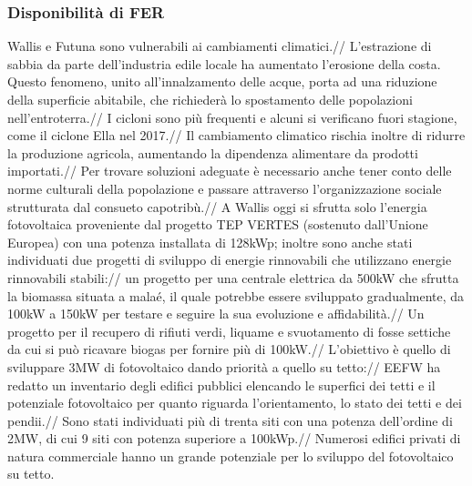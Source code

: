 \documentclass[fleqn,10pt]{SelfArx} %
\begin{document}
\subsubsection{Disponibilità di FER}
Wallis e Futuna sono vulnerabili ai cambiamenti climatici.//
L'estrazione di sabbia da parte dell'industria edile locale ha aumentato l'erosione della costa. Questo fenomeno, unito all'innalzamento delle acque, porta ad una riduzione della superficie abitabile, che richiederà  lo spostamento delle popolazioni nell'entroterra.//
I cicloni sono più frequenti e alcuni si verificano fuori stagione, come il ciclone Ella nel 2017.//
Il cambiamento climatico rischia inoltre di ridurre la produzione agricola, aumentando la dipendenza alimentare da prodotti importati.//
Per trovare soluzioni adeguate è necessario anche tener conto delle norme culturali della popolazione e passare attraverso l'organizzazione sociale strutturata dal consueto capotribù.//
A Wallis oggi si sfrutta solo l'energia fotovoltaica proveniente dal progetto TEP VERTES (sostenuto dall'Unione Europea) con una potenza installata di 128kWp; inoltre sono anche stati individuati due progetti di sviluppo di energie rinnovabili che utilizzano energie rinnovabili stabili://
un progetto per una centrale elettrica da 500kW che sfrutta la biomassa situata a malaé, il quale potrebbe essere sviluppato gradualmente, da 100kW a 150kW per testare e seguire la sua evoluzione e affidabilità.//
Un progetto per il recupero di rifiuti verdi, liquame e svuotamento di fosse settiche da cui si può ricavare biogas per fornire più di 100kW.//
L'obiettivo è quello di sviluppare 3MW di fotovoltaico dando priorità a quello su tetto://
EEFW ha redatto un inventario degli edifici pubblici elencando le superfici dei tetti e il potenziale fotovoltaico per quanto riguarda l'orientamento, lo stato dei tetti e dei pendii.// 
Sono stati individuati più di trenta siti con una potenza dell'ordine di 2MW, di cui 9 siti con potenza superiore a 100kWp.//
Numerosi edifici privati di natura commerciale hanno un grande potenziale per lo sviluppo del fotovoltaico su tetto.
\end{document}
